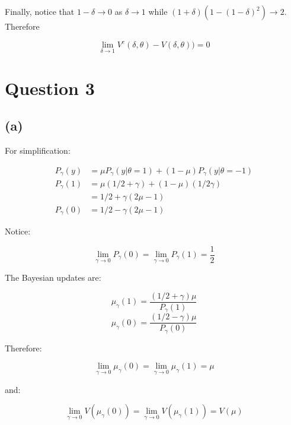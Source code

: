 \documentclass{article}
\begin{document}
Finally, notice that $1 - \delta \to 0$ as $\delta \to 1$ while
$(1 + \delta)(1 - (1 - \delta)^2) \to 2$. Therefore

\[
  \lim_{\delta \to 1} V^c(\delta, \theta) - V(\delta, \theta)) = 0
\]



\section{Question 3}%
\label{sec:Question 3}

\subsection{(a)} %
For simplification:

\[
\begin{split}
  P_{\gamma}(y) & = \mu P_{\gamma}(y| \theta = 1) + (1 - \mu)P_{\gamma}(y|\theta = -1) \\
  P_{\gamma}(1) & = \mu (1/2 + \gamma) + (1 - \mu)(1/2 \gamma) \\
                & = 1/2 + \gamma(2\mu - 1) \\
  P_{\gamma}(0) & = 1/2 - \gamma(2\mu - 1)
\end{split}
\]

Notice:

\[
  \lim_{\gamma \to 0} P_{\gamma}(0) = \lim_{\gamma \to 0} P_{\gamma}(1) = \frac{1}{2}
\]

The Bayesian updates are:

\[
  \mu_\gamma(1) = \frac{(1/2 + \gamma)\mu}{P_\gamma(1)}
\]
\[
  \mu_\gamma(0) = \frac{(1/2 - \gamma)\mu}{P_\gamma(0)}
\]

Therefore:

\[
  \lim_{\gamma \to 0} \mu_\gamma(0) = \lim_{\gamma \to 0} \mu_\gamma(1) = \mu
\]

and:

\[
  \lim_{\gamma \to 0} V(\mu_\gamma(0)) = \lim_{\gamma \to 0} V(\mu_\gamma(1)) = V(\mu)
\]


\end{document}
